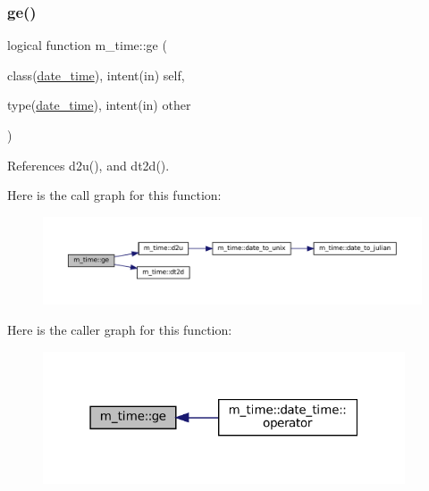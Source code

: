\subsubsection{\texorpdfstring{ge()}{ge()}}
{\footnotesize\ttfamily logical function m\+\_\+time\+::ge (\begin{DoxyParamCaption}\item[{class(\mbox{\hyperlink{structm__time_1_1date__time}{date\+\_\+time}}), intent(in)}]{self,  }\item[{type(\mbox{\hyperlink{structm__time_1_1date__time}{date\+\_\+time}}), intent(in)}]{other }\end{DoxyParamCaption})\hspace{0.3cm}{\ttfamily [private]}}



References d2u(), and dt2d().

Here is the call graph for this function\+:\nopagebreak
\begin{figure}[H]
\begin{center}
\leavevmode
\includegraphics[width=350pt]{namespacem__time_aae8c0dfd78a61889a0d6444448ac0bb9_cgraph}
\end{center}
\end{figure}
Here is the caller graph for this function\+:\nopagebreak
\begin{figure}[H]
\begin{center}
\leavevmode
\includegraphics[width=304pt]{namespacem__time_aae8c0dfd78a61889a0d6444448ac0bb9_icgraph}
\end{center}
\end{figure}
\mbox{\label{namespacem__time_a7903410a1d28bcdf3d33ab0c2d74b124}} 
